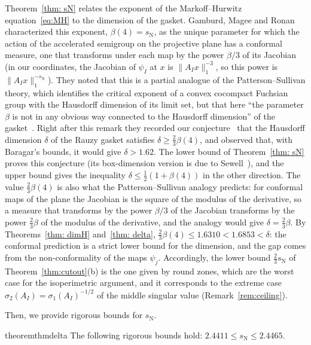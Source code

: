 \documentclass[11pt]{amsart}
\theoremstyle{definition}
\theoremstyle{remark}
\newcommand{\sN}{s_{\mathrm N}}
\newcommand{\norm}[1]{\lVert #1\rVert}
\begin{document}
Theorem~\ref{thm: sN} relates the exponent of the Markoff--Hurwitz equation~\eqref{eq:MH} to the dimension of the gasket. Gamburd, Magee and Ronan characterized this exponent, $\beta(4)=\sN$, as the unique parameter for which the action of the accelerated semigroup on the projective plane has a conformal measure, one that transforms under each map by the power $\beta/3$ of its Jacobian~\cite[Thm.~10 and Lemma~44]{GMR19} (in our coordinates, the Jacobian of $\psi_I$ at $x$ is $\norm{A_Ix}_1^{-3}$, so this power is $\norm{A_Ix}_1^{-\sN}$). They noted that this is a partial analogue of the Patterson--Sullivan theory, which identifies the critical exponent of a convex cocompact Fuchsian group with the Hausdorff dimension of its limit set, but that here ``the parameter $\beta$ is not in any obvious way connected to the Hausdorff dimension'' of the gasket~\cite[Remark~11]{GMR19}. Right after this remark they recorded our conjecture~\cite{DL15EM} that the Hausdorff dimension $\delta$ of the Rauzy gasket satisfies $\delta\ge\frac23\beta(4)$, and observed that, with Baragar's bounds, it would give $\delta>1.62$. The lower bound of Theorem~\ref{thm: sN} proves this conjecture (its box-dimension version is due to Sewell~\cite[Thm.~1.8]{Sew23}), and the upper bound gives the inequality $\delta\le\frac12(1+\beta(4))$ in the other direction.
The value $\frac23\beta(4)$ is also what the Patterson--Sullivan analogy predicts: for conformal maps of the plane the Jacobian is the square of the modulus of the derivative, so a measure that transforms by the power $\beta/3$ of the Jacobian transforms by the power $\frac23\beta$ of the modulus of the derivative, and the analogy would give $\delta=\frac23\beta$. By Theorems~\ref{thm: dimH} and~\ref{thm: delta}, $\frac23\beta(4)\le1.6310<1.6853<\delta$: the conformal prediction is a strict lower bound for the dimension, and the gap comes from the non-conformality of the maps $\psi_j$. Accordingly, the lower bound $\frac23\sN$ of Theorem~\ref{thm:cutout}(b) is the one given by round zones, which are the worst case for the isoperimetric argument, and it corresponds to the extreme case $\sigma_2(A_I)=\sigma_1(A_I)^{-1/2}$ of the middle singular value (Remark~\ref{rem:ceiling}).

\medskip
Then, we provide rigorous bounds for $\sN$.

\begin{restatable}{theorem}{thmdelta}
    \label{thm: delta}
    The following rigorous bounds hold:
    $2.4411\le \sN\le 2.4465$.
\end{restatable}
\end{document}

